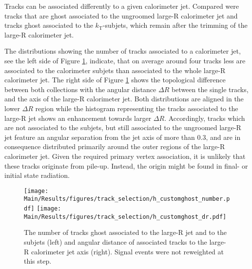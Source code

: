 Tracks can be associated differently to a given calorimeter jet. Compared were tracks that are ghost associated to the ungroomed large-R calorimeter jet and tracks ghost associated to 
the $k_\mathrm{T}$-subjets, which remain after the trimming of the large-R calorimeter jet. 

The distributions showing the number of tracks associated to a calorimeter jet, see the left side of Figure \ref{fig:delta_R}, indicate, that on average around four tracks less are associated to the calorimeter subjets than associated to the whole large-R calorimeter jet. The right side of Figure \ref{fig:delta_R} shows the topological difference between both collections with the angular distance $\Delta R$ between the single tracks, and the axis of the large-R calorimeter jet. Both distributions are aligned in the lower $\Delta R$ region while the histogram representing the tracks associated to the large-R jet shows an enhancement towards larger $\Delta R$. Accordingly, tracks which are not associated to the subjets, but still associated to the ungroomed large-R jet feature an angular separation from the jet axis of more than $0.3$, and are in consequence distributed primarily around the outer regions of the large-R calorimeter jet. Given the required primary vertex association, it is unlikely that these tracks originate from pile-up. Instead, the origin might be found in final- or initial state radiation. 
\begin{figure}
	\texttt{[image: Main/Results/figures/track\_selection/h\_customghost\_number.pdf]} \hspace{1mm}
	\texttt{[image: Main/Results/figures/track\_selection/h\_customghost\_dr.pdf]}
\caption{\footnotesize{The number of tracks ghost associated to the large-R jet and to the subjets (left) and angular distance of associated tracks to the large-R calorimeter jet axis (right). Signal events were not reweighted at this step.}}\label{fig:delta_R}
\end{figure}


